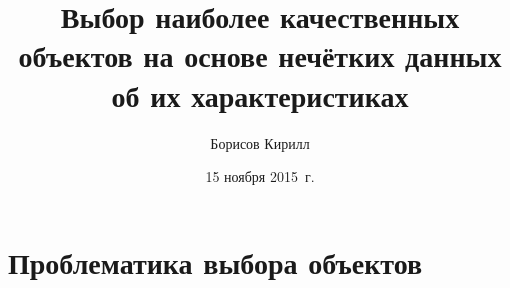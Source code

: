 



\title[Выбор объектов по экспертным оценкам]{Выбор наиболее качественных объектов на основе нечётких данных об их характеристиках}
\author{Борисов Кирилл}

\date{15 ноября 2015~г.}


\sloppy

\maketitle

\section{Проблематика выбора объектов}
